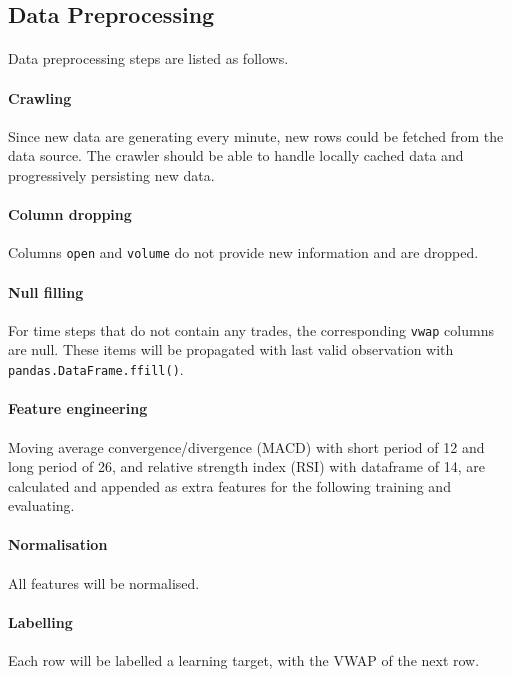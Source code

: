 \documentclass[12pt, letterpaper]{article}
\begin{document}
\subsection{Data Preprocessing}

\paragraph{}
Data preprocessing steps are listed as follows.

\paragraph{Crawling} Since new data are generating every minute, new rows could be fetched from the data source. The crawler should be able to handle locally cached data and progressively persisting new data.

\paragraph{Column dropping} Columns \texttt{open} and \texttt{volume} do not provide new information and are dropped.

\paragraph{Null filling} For time steps that do not contain any trades, the corresponding \texttt{vwap} columns are null. These items will be propagated with last valid observation with \texttt{pandas.DataFrame.ffill()}.

\paragraph{Feature engineering} Moving average convergence/divergence (MACD) with short period of 12 and long period of 26, and relative strength index (RSI) with dataframe of 14, are calculated and appended as extra features for the following training and evaluating.

\paragraph{Normalisation} All features will be normalised.

\paragraph{Labelling} Each row will be labelled a learning target, with the VWAP of the next row.
\end{document}
